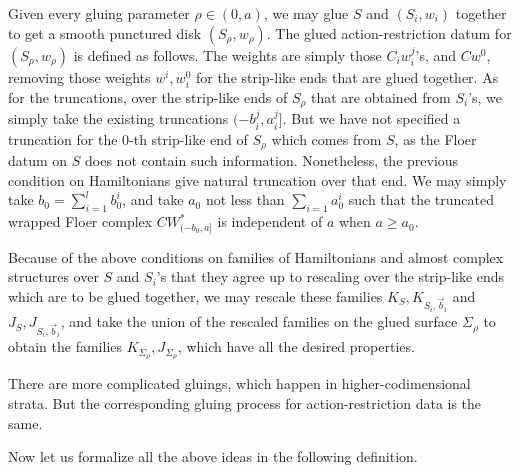 \documentclass{amsart}
\numberwithin{equation}{section}
\numberwithin{figure}{section}
\begin{document}
	Given every gluing parameter $\rho \in (0, a)$, we may glue $S$ and $(S_{i}, w_{i})$ together to get a smooth punctured disk $(S_{\rho}, w_{\rho})$. The glued action-restriction datum for $(S_{\rho}, w_{\rho})$ is defined as follows. The weights are simply those $C_{i} w_{i}^{j}$'s, and $C w^{0}$, removing those weights $w^{i}, w_{i}^{0}$ for the strip-like ends that are glued together. As for the truncations, over the strip-like ends of $S_{\rho}$ that are obtained from $S_{i}$'s, we simply take the existing truncations $(-b_{i}^{j}, a_{i}^{j}]$. But we have not specified a truncation for the $0$-th strip-like end of $S_{\rho}$ which comes from $S$, as the Floer datum on $S$ does not contain such information. Nonetheless, the previous condition on Hamiltonians give natural truncation over that end. We may simply take $b_{0} = \sum_{i=1}^{l} b^{i}_{0}$, and take $a_{0}$ not less than $\sum_{i=1}a^{i}_{0}$ such that the truncated wrapped Floer complex $CW^{*}_{(-b_{0}, a]}$ is independent of $a$ when $a \ge a_{0}$. \par
	Because of the above conditions on families of Hamiltonians and almost complex structures over $S$ and $S_{i}$'s that they agree up to rescaling over the strip-like ends which are to be glued together, we may rescale these families $K_{S}, K_{S_{i}, \vec{b}_{i}}$ and $J_{S}, J_{S_{i}, \vec{b}_{i}}$, and take the union of the rescaled families on the glued surface $\Sigma_{\rho}$ to obtain the families $K_{\Sigma_{\rho}}, J_{\Sigma_{\rho}}$, which have all the desired properties. \par
	There are more complicated gluings, which happen in higher-codimensional strata. But the corresponding gluing process for action-restriction data is the same. \par
	Now let us formalize all the above ideas in the following definition. \par
\end{document}
